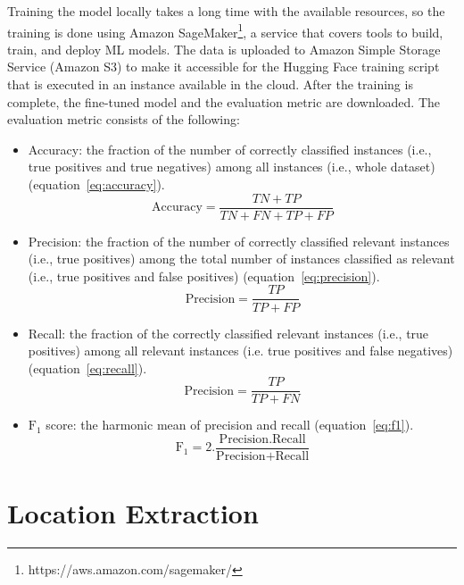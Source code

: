 Training the model locally takes a long time with the available resources, so the training is done
using Amazon SageMaker\footnote{https://aws.amazon.com/sagemaker/}, a service that covers tools to
build, train, and deploy \ac{ML} models. The data is uploaded to Amazon Simple Storage Service
(Amazon S3) to make it accessible for the Hugging Face training script that is executed in an
instance available in the cloud. After the training is complete, the fine-tuned model and the
evaluation metric are downloaded. The evaluation metric consists of the following:

\begin{itemize}
  \item Accuracy: the fraction of the number of correctly classified instances (i.e., true positives
    and true negatives) among all instances (i.e., whole dataset) (equation~\ref{eq:accuracy}).
 \begin{equation}
   \text{Accuracy}=\frac{TN+TP}{TN+FN+TP+FP} 
   \label{eq:accuracy}
\end{equation}
\item Precision: the fraction of the number of correctly classified relevant instances (i.e., true
  positives) among the total number of instances classified as relevant (i.e., true positives and
  false positives) (equation~\ref{eq:precision}).
 \begin{equation}
   \text{Precision}=\frac{TP}{TP+FP} 
   \label{eq:precision}
\end{equation}
\item Recall: the fraction of the correctly classified relevant instances (i.e., true positives)
  among all relevant instances (i.e. true positives and false negatives) (equation~\ref{eq:recall}).
 \begin{equation}
   \text{Precision}=\frac{TP}{TP+FN} 
   \label{eq:recall}
\end{equation}
\item $\text{F}_1$ score: the harmonic mean of precision and recall (equation~\ref{eq:f1}).
 \begin{equation}
   \text{F}_1 =2.\frac{\text{Precision}.\text{Recall}}{\text{Precision}+\text{Recall}} 
   \label{eq:f1}
\end{equation}
\end{itemize}
  

\section{Location Extraction}

